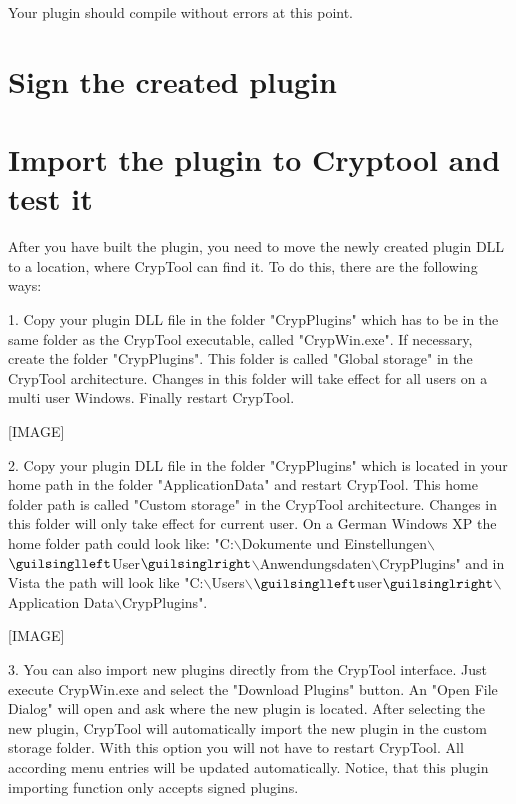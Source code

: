 Your plugin should compile without errors at this point.
\section{Sign the created plugin}\label{sec:SignTheCreatedPlugin}

\section{Import the plugin to Cryptool and test it}\label{sec:ImportThePluginToCryptoolAndTestIt}
After you have built the plugin, you need to move the newly created plugin DLL to a location, where CrypTool can find it. To do this, there are the following ways:

\hspace{20pt}1. Copy your plugin DLL file in the folder "CrypPlugins" which has to be in the same folder as the CrypTool executable, called "CrypWin.exe". If necessary, create the folder "CrypPlugins". This folder is called "Global storage" in the CrypTool architecture. Changes in this folder will take effect for all users on a multi user Windows. Finally restart CrypTool.

[IMAGE]

\hspace{20pt}2. Copy your plugin DLL file in the folder "CrypPlugins" which is located in your home path in the folder "ApplicationData" and restart CrypTool.  This home folder path is called "Custom storage" in the CrypTool architecture. Changes in this folder will only take effect for current user.  On a German Windows XP the home folder path could look like:
"C:$\backslash$Dokumente und Einstellungen$\backslash$$\guilsinglleft$User$\guilsinglright$$\backslash$Anwendungsdaten$\backslash$CrypPlugins" and in Vista the path will look like "C:$\backslash$Users$\backslash$$\guilsinglleft$user$\guilsinglright$$\backslash$Application Data$\backslash$CrypPlugins".

[IMAGE]

\hspace{20pt}3. You can also import new plugins directly from the CrypTool interface. Just execute CrypWin.exe and select the "Download Plugins" button. An "Open File Dialog" will open and ask where the new plugin is located. After selecting the new plugin, CrypTool will automatically import the new plugin in the custom storage folder. With this option you will not have to restart CrypTool. All according menu entries will be updated automatically.
Notice, that this plugin importing function only accepts signed plugins.

